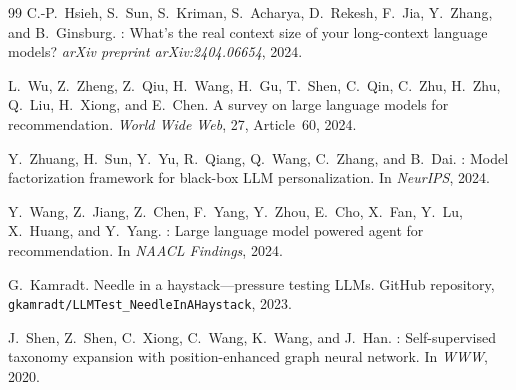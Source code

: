 \documentclass[sigconf,review,anonymous]{acmart}
\begin{document}
\begin{thebibliography}{99}
C.-P.~Hsieh, S.~Sun, S.~Kriman, S.~Acharya, D.~Rekesh, F.~Jia, Y.~Zhang, and B.~Ginsburg.
: What's the real context size of your long-context language models?
\newblock \textit{arXiv preprint arXiv:2404.06654}, 2024.

L.~Wu, Z.~Zheng, Z.~Qiu, H.~Wang, H.~Gu, T.~Shen, C.~Qin, C.~Zhu, H.~Zhu, Q.~Liu, H.~Xiong, and E.~Chen.
\newblock A survey on large language models for recommendation.
\newblock \textit{World Wide Web}, 27, Article~60, 2024.

Y.~Zhuang, H.~Sun, Y.~Yu, R.~Qiang, Q.~Wang, C.~Zhang, and B.~Dai.
: Model factorization framework for black-box {LLM} personalization.
\newblock In \textit{NeurIPS}, 2024.

Y.~Wang, Z.~Jiang, Z.~Chen, F.~Yang, Y.~Zhou, E.~Cho, X.~Fan, Y.~Lu, X.~Huang, and Y.~Yang.
: Large language model powered agent for recommendation.
\newblock In \textit{NAACL Findings}, 2024.

G.~Kamradt.
\newblock Needle in a haystack---pressure testing {LLM}s.
\newblock GitHub repository, \texttt{gkamradt/LLMTest\_NeedleInAHaystack}, 2023.

J.~Shen, Z.~Shen, C.~Xiong, C.~Wang, K.~Wang, and J.~Han.
: Self-supervised taxonomy expansion with position-enhanced graph neural network.
\newblock In \textit{WWW}, 2020.

\end{thebibliography}
\endgroup
\end{document}
